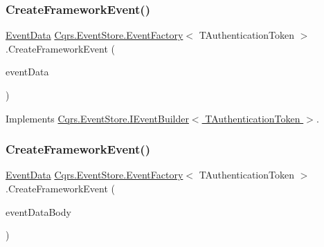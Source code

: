 \mbox{\label{classCqrs_1_1EventStore_1_1EventFactory_ae514998a8368283f882014cc0db5b2b2}} 
\subsubsection{\texorpdfstring{Create\+Framework\+Event()}{CreateFrameworkEvent()}\hspace{0.1cm}{\footnotesize\ttfamily [2/4]}}
{\footnotesize\ttfamily \hyperlink{classCqrs_1_1Events_1_1EventData}{Event\+Data} \hyperlink{classCqrs_1_1EventStore_1_1EventFactory}{Cqrs.\+Event\+Store.\+Event\+Factory}$<$ T\+Authentication\+Token $>$.Create\+Framework\+Event (\begin{DoxyParamCaption}\item[{\hyperlink{interfaceCqrs_1_1Events_1_1IEvent}{I\+Event}$<$ T\+Authentication\+Token $>$}]{event\+Data }\end{DoxyParamCaption})}



Implements \hyperlink{interfaceCqrs_1_1EventStore_1_1IEventBuilder_a8ee9560f7b53c67b9946c3b0719eca96}{Cqrs.\+Event\+Store.\+I\+Event\+Builder$<$ T\+Authentication\+Token $>$}.

\mbox{\label{classCqrs_1_1EventStore_1_1EventFactory_adbcf9f3c67cfef3fe894e5fb53e8b800}} 
\subsubsection{\texorpdfstring{Create\+Framework\+Event()}{CreateFrameworkEvent()}\hspace{0.1cm}{\footnotesize\ttfamily [3/4]}}
{\footnotesize\ttfamily \hyperlink{classCqrs_1_1Events_1_1EventData}{Event\+Data} \hyperlink{classCqrs_1_1EventStore_1_1EventFactory}{Cqrs.\+Event\+Store.\+Event\+Factory}$<$ T\+Authentication\+Token $>$.Create\+Framework\+Event (\begin{DoxyParamCaption}\item[{string}]{event\+Data\+Body }\end{DoxyParamCaption})}



